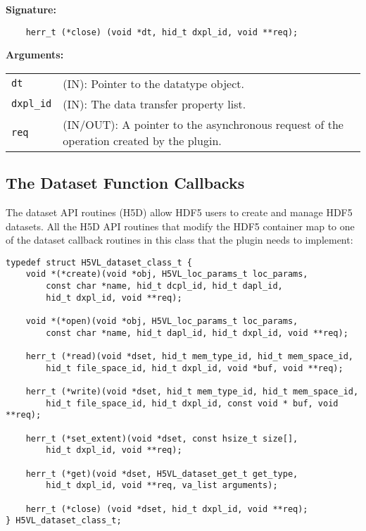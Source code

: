 \textbf{Signature:}
\begin{lstlisting}
    herr_t (*close) (void *dt, hid_t dxpl_id, void **req);
\end{lstlisting}

\textbf{Arguments:}\\
\begin{tabular}{l p{10cm}}
  {\tt dt} & (IN): Pointer to the datatype object.\\
  {\tt dxpl\_id} & (IN): The data transfer property list.\\
  {\tt req} & (IN/OUT): A pointer to the asynchronous request of the
  operation created by the plugin.\\
\end{tabular}

\subsection{The Dataset Function Callbacks}

The dataset API routines (H5D) allow HDF5 users to create and manage
HDF5 datasets. All the H5D API routines that modify the HDF5 container
map to one of the dataset callback routines in this class that the
plugin needs to implement:

\begin{lstlisting}
typedef struct H5VL_dataset_class_t {
    void *(*create)(void *obj, H5VL_loc_params_t loc_params, 
        const char *name, hid_t dcpl_id, hid_t dapl_id, 
        hid_t dxpl_id, void **req);

    void *(*open)(void *obj, H5VL_loc_params_t loc_params, 
        const char *name, hid_t dapl_id, hid_t dxpl_id, void **req);

    herr_t (*read)(void *dset, hid_t mem_type_id, hid_t mem_space_id, 
        hid_t file_space_id, hid_t dxpl_id, void *buf, void **req);

    herr_t (*write)(void *dset, hid_t mem_type_id, hid_t mem_space_id, 
        hid_t file_space_id, hid_t dxpl_id, const void * buf, void **req);

    herr_t (*set_extent)(void *dset, const hsize_t size[], 
        hid_t dxpl_id, void **req);

    herr_t (*get)(void *dset, H5VL_dataset_get_t get_type, 
        hid_t dxpl_id, void **req, va_list arguments);

    herr_t (*close) (void *dset, hid_t dxpl_id, void **req);
} H5VL_dataset_class_t;
\end{lstlisting}

